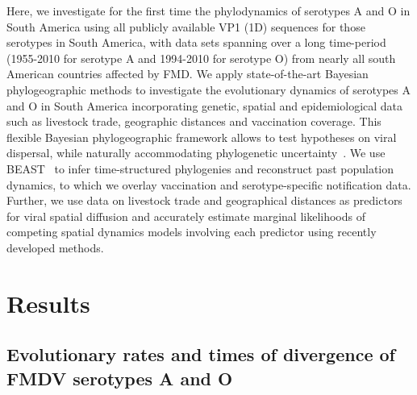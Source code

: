 \documentclass[10pt]{article}
\begin{document}
Here, we investigate for the first time the phylodynamics of serotypes A and O in South America using all publicly available VP1 (1D) sequences for those serotypes in South America, with data sets spanning over a long time-period (1955-2010 for serotype A and 1994-2010 for serotype O) from nearly all south American countries affected by FMD.
We apply state-of-the-art Bayesian phylogeographic methods to investigate the evolutionary dynamics of serotypes A and O in South America incorporating  genetic, spatial and epidemiological data such as livestock trade, geographic distances and vaccination coverage.
This flexible Bayesian phylogeographic framework allows to test hypotheses on viral dispersal, while naturally accommodating phylogenetic uncertainty~\cite{roots, towards}.
We use BEAST~\cite{beast2012} to infer time-structured phylogenies and reconstruct past population dynamics, to which we overlay vaccination and serotype-specific notification data.
Further, we use data on livestock trade and geographical distances as predictors for viral spatial diffusion and accurately estimate marginal likelihoods of competing spatial dynamics models involving each predictor using recently developed methods. %

\section*{Results}

\subsection*{Evolutionary rates and times of divergence of FMDV serotypes A and O}
\end{document}
